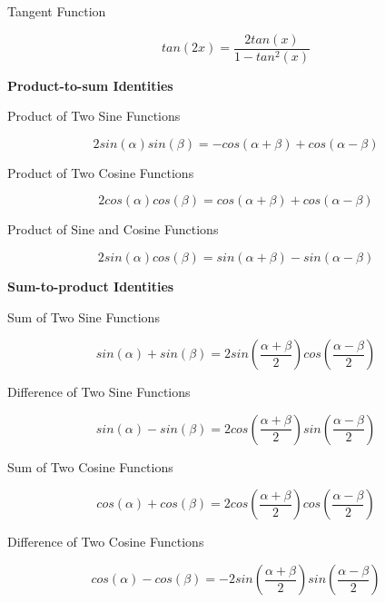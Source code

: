 \begin{thm}
\begin{alist}
\begin{rlist}
      \item Tangent Function

      $$tan(2x)=\frac{2tan(x)}{1-tan^{2}(x)}$$

    \end{rlist}
    \item \textbf{Product-to-sum Identities}
    \begin{rlist}
      \item Product of Two Sine Functions

      $$2sin(\alpha)sin(\beta)=-cos(\alpha +\beta)+cos(\alpha -\beta)$$

      \item Product of Two Cosine Functions

      $$2cos(\alpha)cos(\beta)=cos(\alpha +\beta)+cos(\alpha -\beta)$$

      \item Product of Sine and Cosine Functions

      $$2sin(\alpha)cos(\beta)=sin(\alpha +\beta)-sin(\alpha -\beta)$$

    \end{rlist}
    \item \textbf{Sum-to-product Identities}
    \begin{rlist}
      \item Sum of Two Sine Functions

      $$sin(\alpha)+sin(\beta)=2sin(\frac{\alpha +\beta}{2})cos(\frac{\alpha -\beta}{2})$$

      \item Difference of Two Sine Functions

      $$sin(\alpha)-sin(\beta)=2cos(\frac{\alpha +\beta}{2})sin(\frac{\alpha -\beta}{2})$$

      \item Sum of Two Cosine Functions

      $$cos(\alpha)+cos(\beta)=2cos(\frac{\alpha +\beta}{2})cos(\frac{\alpha -\beta}{2})$$

      \item Difference of Two Cosine Functions

      $$cos(\alpha)-cos(\beta)=-2sin(\frac{\alpha +\beta}{2})sin(\frac{\alpha -\beta}{2})$$

    \end{rlist}
  \end{alist}
\end{thm}

